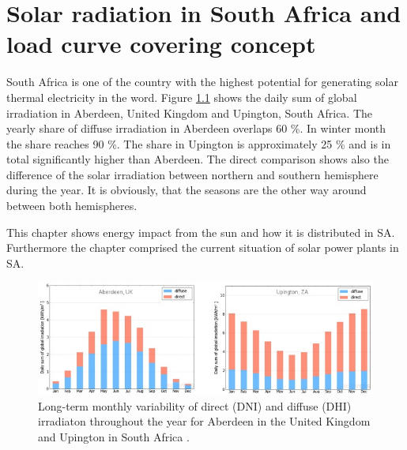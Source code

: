 \chapter{Solar radiation in South Africa and load curve covering concept}\label{Solar power in South Africa}
South Africa is one of the country with the highest potential for generating solar thermal electricity in the word. Figure \ref{DHI-DIF} shows  the daily sum of global irradiation in Aberdeen, United Kingdom and Upington, South Africa. The yearly share of diffuse irradiation in Aberdeen overlaps 60 \%. In winter month the share reaches 90 \%. The share in Upington is approximately 25 \% and is in total significantly higher than Aberdeen. The direct comparison shows also the difference of the solar irradiation between northern and southern hemisphere during the year. It is obviously, that the seasons are the other way around between both hemispheres.



This chapter shows energy impact from the sun and how it is distributed in SA. Furthermore the chapter comprised the current situation of solar power plants in SA.
\begin{figure}[h!] %
\centering
\includegraphics[width=1\linewidth]{FIG/DHI-DIF}
\caption[Long-term monthly variability of direct (DNI) and diffuse (DHI) irradiaton throughout the year for Aberdeen in the United Kingdom and Upington in South Africa.]{Long-term monthly variability of direct (DNI) and diffuse (DHI) irradiaton throughout the year for Aberdeen in the United Kingdom and Upington in South Africa \cite{SolarGIS2015}.}\label{DHI-DIF}
\end{figure} 

